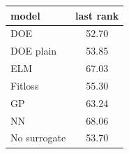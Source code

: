 \begin{tabular}{|lc|}
\hline
model & last rank\\
\hline
DOE & 52.70 \\
DOE plain & 53.85 \\
ELM & 67.03 \\
Fitloss & 55.30 \\
GP & 63.24 \\
NN & 68.06 \\
No surrogate & 53.70 \\
\hline
\end{tabular}
